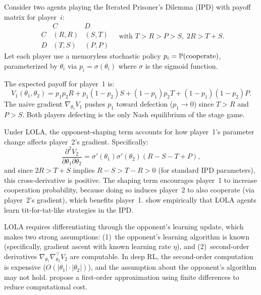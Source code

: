 \documentclass[11pt,a4paper]{article}
\begin{document}
\begin{example}
\label{ex:lola-ipd}
Consider two agents playing the Iterated Prisoner's Dilemma (IPD) with
payoff matrix for player~$i$:
\[
  \begin{array}{c|cc}
    & C & D \\
    \hline
    C & (R, R) & (S, T) \\
    D & (T, S) & (P, P)
  \end{array}
  \quad \text{with } T > R > P > S,\; 2R > T + S.
\]
Let each player use a memoryless stochastic policy
$p_i = \mathbb{P}(\text{cooperate})$, parameterized by $\theta_i$ via
$p_i = \sigma(\theta_i)$ where $\sigma$ is the sigmoid function.

The expected payoff for player~1 is:
\[
  V_1(\theta_1, \theta_2) = p_1 p_2 R + p_1(1-p_2) S
    + (1-p_1) p_2 T + (1-p_1)(1-p_2) P.
\]
The naive gradient $\nabla_{\theta_1} V_1$ pushes $p_1$ toward defection
($p_1 \to 0$) since $T > R$ and $P > S$.  Both players defecting is the
only Nash equilibrium of the stage game.

Under LOLA, the opponent-shaping term accounts for how player~1's
parameter change affects player~2's gradient.  Specifically:
\[
  \frac{\partial^2 V_2}{\partial \theta_1 \partial \theta_2}
  = \sigma'(\theta_1)\sigma'(\theta_2)(R - S - T + P),
\]
and since $2R > T + S$ implies $R - S > T - R > 0$ (for standard IPD
parameters), this cross-derivative is positive.  The shaping term
encourages player~1 to increase cooperation probability, because doing
so induces player~2 to also cooperate (via player~2's gradient), which
benefits player~1.  \citet{foerster2018lola} show empirically that LOLA
agents learn tit-for-tat-like strategies in the IPD.
\end{example}

\begin{warning}
LOLA requires differentiating through the opponent's learning update,
which makes two strong assumptions: (1)~the opponent's learning
algorithm is known (specifically, gradient ascent with known learning
rate $\eta$), and (2)~second-order derivatives
$\nabla_{\theta_1} \nabla_{\theta_2}^\top V_2$ are computable.  In deep
RL, the second-order computation is expensive ($O(|\theta_1| \cdot |\theta_2|)$),
and the assumption about the opponent's algorithm may not hold.
\citet{foerster2018lola} propose a first-order approximation using
finite differences to reduce computational cost.
\end{warning}
\end{document}
